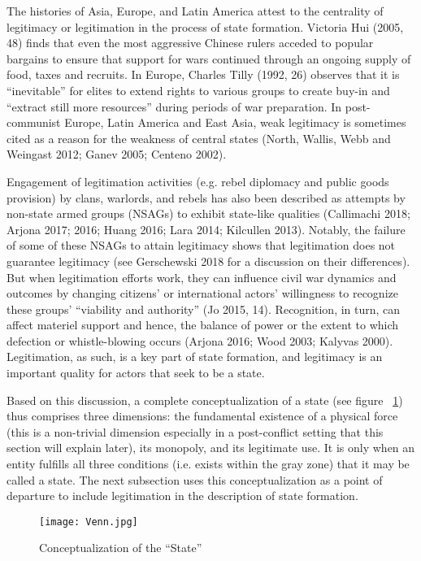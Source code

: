 \documentclass [11pt]{article}
\begin{document}
The histories of Asia, Europe, and Latin America attest to the centrality of legitimacy or legitimation in the process of state formation. Victoria Hui (2005, 48) finds that even the most aggressive Chinese rulers acceded to popular bargains to ensure that support for wars continued through an ongoing supply of food, taxes and recruits. In Europe, Charles Tilly (1992, 26) observes that it is ``inevitable'' for elites to extend rights to various groups to create buy-in and ``extract still more resources'' during periods of war preparation. In post-communist Europe, Latin America and East Asia, weak legitimacy is sometimes cited as a reason for the weakness of central states (North, Wallis, Webb and Weingast 2012; Ganev 2005; Centeno 2002).

Engagement of legitimation activities (e.g. rebel diplomacy and public goods provision) by clans, warlords, and rebels has also been described as attempts by non-state armed groups (NSAGs) to exhibit state-like qualities (Callimachi 2018; Arjona 2017; 2016; Huang 2016; Lara 2014; Kilcullen 2013). Notably, the failure of some of these NSAGs to attain legitimacy shows that legitimation does not guarantee legitimacy (see Gerschewski 2018 for a discussion on their differences). But when legitimation efforts work, they can influence civil war dynamics and outcomes by changing citizens' or international actors' willingness to recognize these groups' ``viability and authority'' (Jo 2015, 14). Recognition, in turn, can affect materiel support and hence, the balance of power or the extent to which defection or whistle-blowing occurs (Arjona 2016; Wood 2003; Kalyvas 2000). Legitimation, as such, is a key part of state formation, and legitimacy is an important quality for actors that seek to be a state.

Based on this discussion, a complete conceptualization of a state (see figure ~\ref{fig1}) thus comprises three dimensions: the fundamental existence of a physical force (this is a non-trivial dimension especially in a post-conflict setting that this section will explain later), its monopoly, and its legitimate use. It is only when an entity fulfills all three conditions (i.e. exists within the gray zone) that it may be called a state. The next subsection uses this conceptualization as a point of departure to include legitimation in the description of state formation.

\begin{figure} [h!]

\caption{Conceptualization of the ``State''}
\label{fig1}%
\begin{center} 
\small
\texttt{[image: Venn.jpg]}
 
\end{center}
\end{figure}
\end{document}
